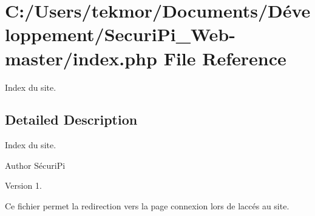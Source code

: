 \section{C\+:/\+Users/tekmor/\+Documents/\+Développement/\+Securi\+Pi\+\_\+\+Web-\/master/index.php File Reference}
\label{index_8php}


Index du site.  




\subsection{Detailed Description}
Index du site. 

\begin{DoxyAuthor}{Author}
S\'{e}curi\+Pi 
\end{DoxyAuthor}
\begin{DoxyVersion}{Version}
1.
\end{DoxyVersion}
Ce fichier permet la redirection vers la page connexion lors de l\textquotesingle{}acc\'{e}s au site. 